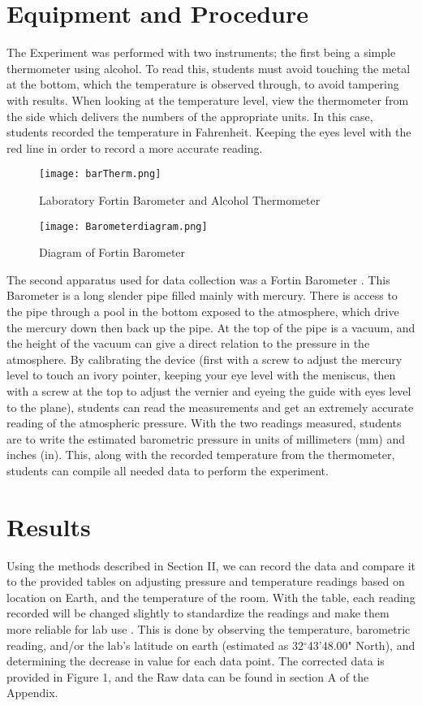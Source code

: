 \documentclass[conf]{new-aiaa}
\begin{document}
\section{Equipment and Procedure}

The Experiment was performed with two instruments; the first being a simple thermometer using alcohol. To read this, students must avoid touching the metal at the bottom, which the temperature is observed through, to avoid tampering with results. When looking at the temperature level, view the thermometer from the side which delivers the numbers of the appropriate units. In this case, students recorded the temperature in Fahrenheit. Keeping the eyes level with the red line in order to record a more accurate reading.\par
\begin{figure}
    \centering
    \texttt{[image: barTherm.png]}
    \caption{Laboratory Fortin Barometer and Alcohol Thermometer}
    \label{fig:enter-label}
\end{figure}
\begin{figure}
    \centering
    \texttt{[image: Barometerdiagram.png]}
    \caption{Diagram of Fortin Barometer}
    \label{fig:enter-label}
\end{figure}

The second apparatus used for data collection was a Fortin Barometer \cite{Fortin}. This Barometer is a long slender pipe filled mainly with mercury. There is access to the pipe through a pool in the bottom exposed to the atmosphere, which drive the mercury down then back up the pipe. At the top of the pipe is a vacuum, and the height of the vacuum can give a direct relation to the pressure in the atmosphere. By calibrating the device (first with a screw to adjust the mercury level to touch an ivory pointer, keeping your eye level with the meniscus, then with a screw at the top to adjust the vernier and eyeing the guide with eyes level to the plane), students can read the measurements and get an extremely accurate reading of the atmospheric pressure. With the two readings measured, students are to write the estimated barometric pressure in units of millimeters (mm) and inches (in). This, along with the recorded temperature from the thermometer, students can compile all needed data to perform the experiment\cite{vid}.\par

\section{Results}
Using the methods described in Section II, we can record the data and compare it to the provided tables on adjusting pressure and temperature readings based on location on Earth, and the temperature of the room. With the table, each reading recorded will be changed slightly to standardize the readings and make them more reliable for lab use \cite{barcor} \cite{tempcor}. This is done by observing the temperature, barometric reading, and/or the lab's latitude on earth (estimated as 32$^\circ$43'48.00" North), and determining the decrease in value for each data point. The corrected data is provided in Figure 1, and the Raw data can be found in section A of the Appendix.
\end{document}
